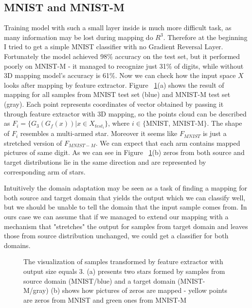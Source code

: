 \documentclass{article}
\begin{document}
\subsection{MNIST and MNIST-M}
\par
Training model with such a small layer inside is much more difficult task, as many information may be lost during mapping do ${R}^{3}$. Therefore at the beginning I tried to get a simple MNIST classifier with no Gradient Reversal Layer. Fortunately the model achieved 98\% accuracy on the test set, but it performed poorly on MNIST-M - it managed to recognize just 31\% of digits, while without 3D mapping model's accuracy is 61\%. Now we can check how the input space ${X}$ looks after mapping by feature extractor. Figure ~\ref{fig:MNIST_3D}(a) shows the result of mapping for all samples from MNIST test set (blue) and MNIST-M test set (gray). Each point represents coordinates of vector obtained by passing it through feature extractor with 3D mapping, so the points cloud can be described as $F_{i} = \{G_{3}(G_{f}(x)) | x \in X_{test_{i}}\}$, where $i \in \{$MNIST, MNIST-M$\}$. The shape of ${F_{i}}$ resembles a multi-armed star. Moreover it seems like $F_{MNIST}$ is just a stretched version of $F_{MNIST-M}$. We can expect that each arm contains mapped pictures of same digit. As we can see in Figure ~\ref{fig:MNIST_3D}(b) zeros from both source and target distributions lie in the same direction and are represented by corresponding arm of stars. \par
Intuitively the domain adaptation may be seen as a task of finding a mapping for both source and target domain that yields the output which we can classify well, but we should be unable to tell the domain that the input sample comes from. In ours case we can assume that if we managed to extend our mapping with a mechanism that "stretches" the output for samples from target domain and leaves those from source distribution unchanged, we could get a classifier for both domains.

\begin{figure}[htb]%
    \centering
    \qquad
    \caption{The visualization of samples transformed by feature extractor with output size equals 3. (a) presents two stars formed by samples from source domain (MNIST/blue) and a target domain (MNIST-M/gray) (b) shows how pictures of zeros are mapped - yellow points are zeros from MNIST and green ones from MNIST-M}%
    \label{fig:MNIST_3D}%
\end{figure}
\end{document}
